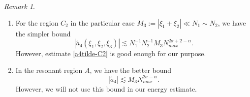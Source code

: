 \documentclass{amsart}
\theoremstyle{definition}
\theoremstyle{remark}
\newtheorem{remark}[theorem]{Remark}
\numberwithin{equation}{section}
\begin{document}
\begin{remark}
\begin{enumerate}
\item[$(i)$]
 For the region $C_2$ in the particular case $M_3:=|\xi_1+\xi_2|\ll N_1\sim N_2$,  we have the simpler bound
 $$
 |\widetilde{a}_4(\xi_1,\xi_2,\xi_3)| \lesssim N_1^{-1}N_2^{-1}M_3 N_{max}^{2\sigma+2-\alpha}.
 $$
 However, estimate \eqref{a4tilde-C2} is good enough for our purpose.
\item[$(ii)$]
In the resonant region $A$, we have the better bound 
\begin{equation} \label{bound:a4tilde-resonant}
|\widetilde{a}_{4}| \lesssim M_3N_{max}^{2\sigma-\alpha} .
\end{equation}
However, we will not use this bound in our energy estimate.
\end{enumerate}
\end{remark}
\end{document}
